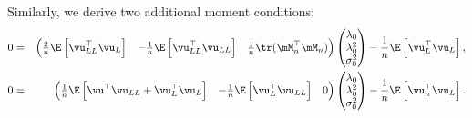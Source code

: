 \documentclass[english,12pt]{book}\usepackage[]{graphicx}\usepackage[]{xcolor}
\begin{document}
Similarly, we derive two additional moment conditions:
\begin{eqnarray}
 0 & = & \begin{pmatrix}
            \frac{2}{n}\E\left[\vu^\top_{LL}\vu_L\right] & -\frac{1}{n}\E\left[\vu_{LL}^\top\vu_{LL}\right] & \frac{1}{n} \tr(\mM^\top_n\mM_n)
          \end{pmatrix}
                      \begin{pmatrix}
              \lambda_0 \\
              \lambda^2_0 \\
              \sigma^2_0
            \end{pmatrix} - \frac{1}{n}\E\left[\vu^\top_L\vu_L\right]\label{eq:Pequation_2_gmm}, \\
 0 & = & \begin{pmatrix}
            \frac{1}{n}\E\left[\vu^\top\vu_{LL} + \vu_L^\top\vu_L\right] & - \frac{1}{n}\E\left[\vu_{L}^\top\vu_{LL}\right] & 0
          \end{pmatrix}
                      \begin{pmatrix}
              \lambda_0 \\
              \lambda^2_0 \\
              \sigma^2_0
            \end{pmatrix} - \frac{1}{n}\E\left[\vu^\top_n\vu_L\right].\label{eq:Pequation_3_gmm}
\end{eqnarray}
\end{document}
